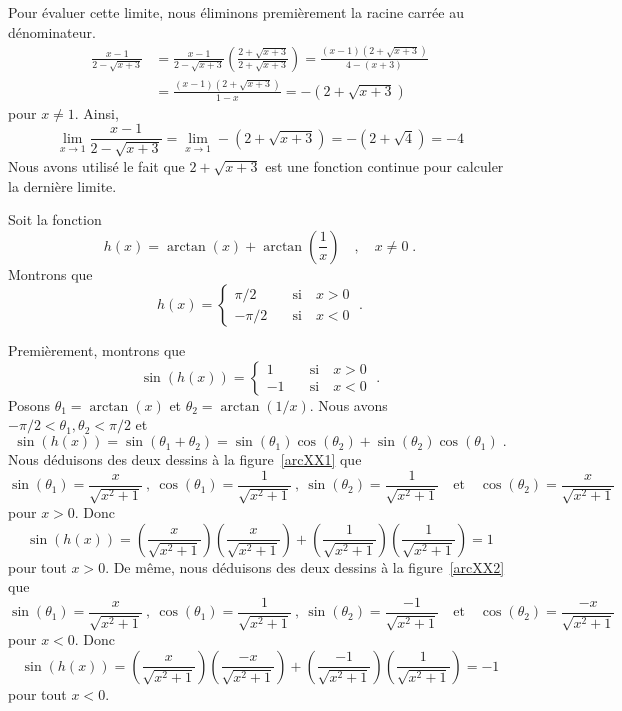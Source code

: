 {\begin{egg}
 Pour évaluer cette limite, nous éliminons premièrement la racine
carrée au dénominateur.
\begin{align*}
\frac{x-1}{2 - \sqrt{x+3}}
&= \frac{x-1}{2 - \sqrt{x+3}}
\left( \frac{2 + \sqrt{x+3}}{2 + \sqrt{x+3}} \right)
= \frac{(x-1)(2 + \sqrt{x+3})}{4 - (x+3)} \\
&= \frac{(x-1)(2 + \sqrt{x+3})}{1 - x}
= -(2 + \sqrt{x+3})
\end{align*}
pour $x \neq 1$.  Ainsi,
\[
\lim_{x\to 1} \frac{x-1}{2 - \sqrt{x+3}}
= \lim_{x\to 1}  -(2 + \sqrt{x+3}) =  -(2 + \sqrt{4}) = -4
\]
Nous avons utilisé le fait que $2 + \sqrt{x+3}$ est une fonction continue pour
calculer la dernière limite.
\end{egg}

\begin{egg}[\theory]
Soit la fonction
\[
h(x) = \arctan(x) + \arctan\left(\frac{1}{x}\right) \quad , \quad
x\neq 0 \; .
\]
Montrons que
\[
h(x) = \begin{cases}
\pi/2 & \quad \text{si} \quad x>0 \\
-\pi/2 & \quad \text{si} \quad x<0
\end{cases} \; .
\]

Premièrement, montrons que
\[
\sin(h(x)) = \begin{cases}
1 & \quad \text{si} \quad x>0 \\
-1 & \quad \text{si} \quad x<0
\end{cases} \; .
\]
Posons $\theta_1 = \arctan(x)$ et $\theta_2 = \arctan(1/x)$.  Nous avons 
$-\pi/2 < \theta_1, \theta_2 < \pi/2$ et
\[
\sin(h(x)) = \sin(\theta_1+\theta_2) = \sin(\theta_1)\cos(\theta_2)
+ \sin(\theta_2)\cos(\theta_1) \; .
\]
Nous déduisons des deux dessins à la figure~\ref{arcXX1} que
\[
\sin(\theta_1) = \frac{x}{\sqrt{x^2+1}} \ ,
\ \cos(\theta_1) = \frac{1}{\sqrt{x^2+1}} \ ,
\ \sin(\theta_2) = \frac{1}{\sqrt{x^2+1}}
\quad \text{et} \quad
\cos(\theta_2) = \frac{x}{\sqrt{x^2+1}}
\]
pour $x>0$.  Donc
\[
\sin(h(x)) = \left(\frac{x}{\sqrt{x^2+1}}\right)
\left(\frac{x}{\sqrt{x^2+1}}\right)
+ \left(\frac{1}{\sqrt{x^2+1}}\right) \left(\frac{1}{\sqrt{x^2+1}}\right) = 1
\]
pour tout $x>0$.
De même, nous déduisons des deux dessins à la figure~\ref{arcXX2} que
\[
\sin(\theta_1) = \frac{x}{\sqrt{x^2+1}} \ ,
\ \cos(\theta_1) = \frac{1}{\sqrt{x^2+1}} \ ,
\ \sin(\theta_2) = \frac{-1}{\sqrt{x^2+1}}
\quad\text{et}\quad
\cos(\theta_2) = \frac{-x}{\sqrt{x^2+1}}
\]
pour $x<0$.  Donc
\[
\sin(h(x)) = \left(\frac{x}{\sqrt{x^2+1}}\right)
\left(\frac{-x}{\sqrt{x^2+1}}\right)
+ \left(\frac{-1}{\sqrt{x^2+1}}\right) \left(\frac{1}{\sqrt{x^2+1}}\right) = -1
\]
pour tout $x<0$.


\end{egg}}
